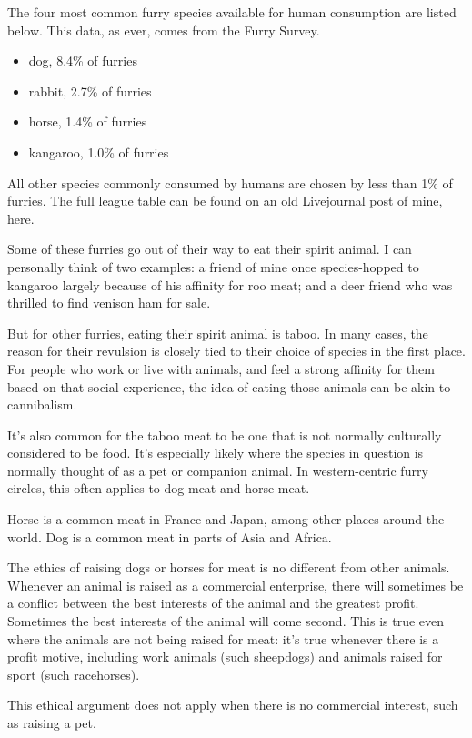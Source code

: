 The four most common furry species available for human consumption are listed below. This data, as ever, comes from the Furry Survey.

\begin{itemize}
  \item dog, 8.4\% of furries
  \item rabbit, 2.7\% of furries
  \item horse, 1.4\% of furries
  \item kangaroo, 1.0\% of furries
\end{itemize}

All other species commonly consumed by humans are chosen by less than 1\% of furries. The full league table can be found on an old Livejournal post of mine, here.

Some of these furries go out of their way to eat their spirit animal. I can personally think of two examples: a friend of mine once species-hopped to kangaroo largely because of his affinity for roo meat; and a deer friend who was thrilled to find venison ham for sale.

But for other furries, eating their spirit animal is taboo. In many cases, the reason for their revulsion is closely tied to their choice of species in the first place. For people who work or live with animals, and feel a strong affinity for them based on that social experience, the idea of eating those animals can be akin to cannibalism.

It's also common for the taboo meat to be one that is not normally culturally considered to be food. It's especially likely where the species in question is normally thought of as a pet or companion animal. In western-centric furry circles, this often applies to dog meat and horse meat.

Horse is a common meat in France and Japan, among other places around the world. Dog is a common meat in parts of Asia and Africa.

The ethics of raising dogs or horses for meat is no different from other animals. Whenever an animal is raised as a commercial enterprise, there will sometimes be a conflict between the best interests of the animal and the greatest profit. Sometimes the best interests of the animal will come second. This is true even where the animals are not being raised for meat: it's true whenever there is a profit motive, including work animals (such sheepdogs) and animals raised for sport (such racehorses).

This ethical argument does not apply when there is no commercial interest, such as raising a pet.

